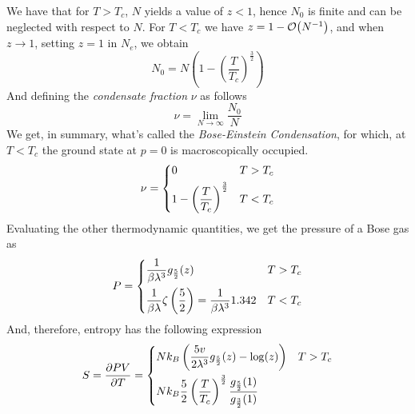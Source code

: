 \documentclass[../qm.tex]{subfiles}
\begin{document}
	We have that for $T>T_c$, $N$ yields a value of $z<1$, hence $N_0$ is finite and can be neglected with respect to $N$. For $T<T_c$ we have $z=1-\order{N^{-1}}$, and when $z\to1$, setting $z=1$ in $N_e$, we obtain
	\begin{equation}
		N_0=N\left( 1-\left( \frac{T}{T_c} \right)^{\frac{3}{2}} \right)
		\label{eq:zeq1bosongas}
	\end{equation}
	And defining the \textit{condensate fraction} $\nu$ as follows
	\begin{equation}
		\nu=\lim_{N\to\infty}\frac{N_0}{N}
		\label{eq:condensatefrac}
	\end{equation}
	We get, in summary, what's called the \textit{Bose-Einstein Condensation}, for which, at $T<T_c$ the ground state at $p=0$ is macroscopically occupied.
	\begin{equation}
		\nu=\begin{dcases}
			0&T>T_c\\
			1-\left( \frac{T}{T_c} \right)^{\frac{3}{2}}&T<T_c
		\end{dcases}
		\label{eq:condensatefracval}
	\end{equation}
	Evaluating the other thermodynamic quantities, we get the pressure of a Bose gas as
	\begin{equation}
		P=\begin{dcases}
			\frac{1}{\beta\lambda^3}g_{\frac{5}{2}}(z)&T>T_c\\
			\frac{1}{\beta\lambda}\zeta\left( \frac{5}{2} \right)=\frac{1}{\beta\lambda^3}1.342&T<T_c
		\end{dcases}
		\label{eq:bosegaspressure}
	\end{equation}
	And, therefore, entropy has the following expression
	\begin{equation}
		S=\pdv{PV}{T}=\begin{dcases}
			Nk_B\left( \frac{5v}{2\lambda^3}g_{\frac{5}{2}}(z)-\log(z) \right)&T>T_c\\
			Nk_B\frac{5}{2}\left( \frac{T}{T_c} \right)^{\frac{3}{2}}\frac{g_{\frac{5}{2}}(1)}{g_{\frac{3}{2}}(1)}
		\end{dcases}
		\label{eq:entropybose}
	\end{equation}
\end{document}

